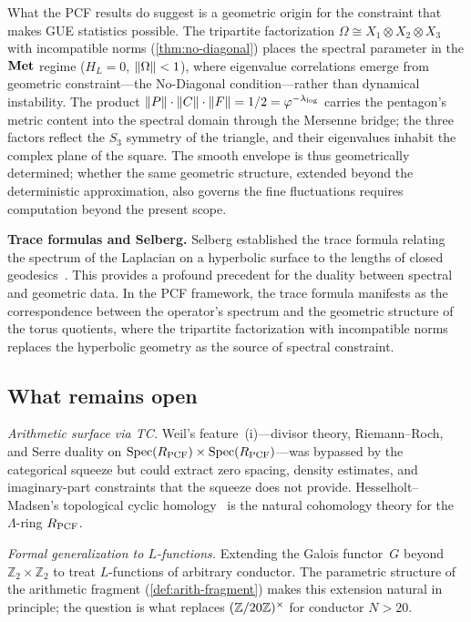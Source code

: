 What the PCF results do suggest is a geometric origin for the
constraint that makes GUE statistics possible.  The tripartite
factorization $\Omega\cong X_1\otimes X_2\otimes X_3$ with
incompatible norms (\cref{thm:no-diagonal}) places the
spectral parameter in the $\mathbf{Met}$ regime
($H_L=0$, $\|\Omega\|<1$), where eigenvalue correlations
emerge from geometric constraint---the No-Diagonal condition---rather
than dynamical instability.  The product
$\|P\|\cdot\|C\|\cdot\|F\|=1/2=\varphi^{-\lambda_{\log}}$
carries the pentagon's metric content into the spectral domain
through the Mersenne bridge; the three factors reflect the $S_3$
symmetry of the triangle, and their eigenvalues inhabit the complex
plane of the square.  The smooth envelope is thus geometrically
determined; whether the same geometric structure, extended beyond the
deterministic approximation, also governs the fine fluctuations
requires computation beyond the present scope.

\smallskip\noindent\textbf{Trace formulas and Selberg.}
Selberg established the trace formula relating the spectrum of the
Laplacian on a hyperbolic surface to the lengths of closed
geodesics~\cite{hejhal1976selberg}.  This provides a profound
precedent for the duality between spectral and geometric data.
In the PCF framework, the trace formula manifests as the
correspondence between the operator's spectrum and the
geometric structure of the torus quotients, where the
tripartite factorization with incompatible norms replaces
the hyperbolic geometry as the source of spectral constraint.


\subsection{What remains open}\label{ssec:remains-open}

\emph{Arithmetic surface via TC.}  Weil's feature~(i)---divisor theory,
Riemann--Roch, and Serre duality on
$\mathrm{Spec}(R_{\mathrm{PCF}})\times\mathrm{Spec}(R_{\mathrm{PCF}})$---was bypassed by
the categorical squeeze but could extract zero spacing, density
estimates, and imaginary-part constraints that the squeeze does not
provide.  Hesselholt--Madsen's topological cyclic homology~\cite{hesselholt1995k} is the
natural cohomology theory for the $\Lambda$-ring $R_{\mathrm{PCF}}$.

\emph{Formal generalization to $L$-functions.}  Extending the Galois
functor~$G$ beyond $\mathbb{Z}_2\times\mathbb{Z}_2$ to treat
$L$-functions of arbitrary conductor.  The parametric structure of the
arithmetic fragment (\cref{def:arith-fragment}) makes this
extension natural in principle; the question is what replaces
$(\mathbb{Z}/20\mathbb{Z})^\times$ for conductor $N>20$.

